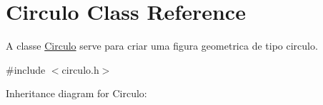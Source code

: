 \hypertarget{classCirculo}{}\section{Circulo Class Reference}
\label{classCirculo}


A classe \hyperlink{classCirculo}{Circulo} serve para criar uma figura geometrica de tipo circulo.  




{\ttfamily \#include $<$circulo.\+h$>$}



Inheritance diagram for Circulo\+:
